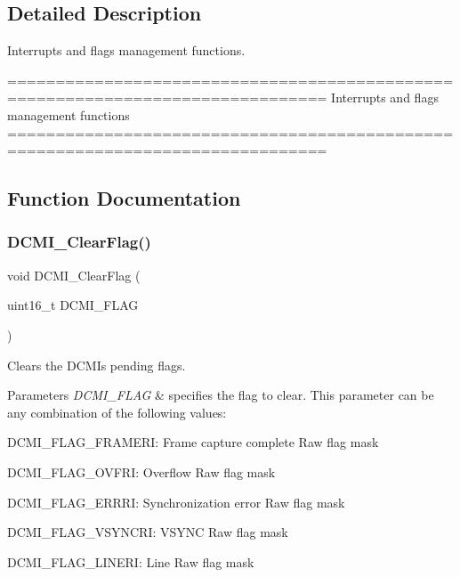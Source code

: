 \subsection{Detailed Description}
Interrupts and flags management functions. 

\begin{DoxyVerb} ===============================================================================
                  Interrupts and flags management functions
 ===============================================================================  \end{DoxyVerb}
 

\subsection{Function Documentation}
\mbox{\label{group__DCMI__Group3_ga1c93caf3ccfecf07cec8e1e0f844ddaa}} 
\subsubsection{D\+C\+M\+I\+\_\+\+Clear\+Flag()}
{\footnotesize\ttfamily void D\+C\+M\+I\+\_\+\+Clear\+Flag (\begin{DoxyParamCaption}\item[{uint16\+\_\+t}]{D\+C\+M\+I\+\_\+\+F\+L\+AG }\end{DoxyParamCaption})}



Clears the D\+C\+MI\textquotesingle{}s pending flags. 


\begin{DoxyParams}{Parameters}
{\em D\+C\+M\+I\+\_\+\+F\+L\+AG} & specifies the flag to clear. This parameter can be any combination of the following values\+: \begin{DoxyItemize}
\item D\+C\+M\+I\+\_\+\+F\+L\+A\+G\+\_\+\+F\+R\+A\+M\+E\+RI\+: Frame capture complete Raw flag mask \item D\+C\+M\+I\+\_\+\+F\+L\+A\+G\+\_\+\+O\+V\+F\+RI\+: Overflow Raw flag mask \item D\+C\+M\+I\+\_\+\+F\+L\+A\+G\+\_\+\+E\+R\+R\+RI\+: Synchronization error Raw flag mask \item D\+C\+M\+I\+\_\+\+F\+L\+A\+G\+\_\+\+V\+S\+Y\+N\+C\+RI\+: V\+S\+Y\+NC Raw flag mask \item D\+C\+M\+I\+\_\+\+F\+L\+A\+G\+\_\+\+L\+I\+N\+E\+RI\+: Line Raw flag mask \end{DoxyItemize}
\\
\hline
\end{DoxyParams}


